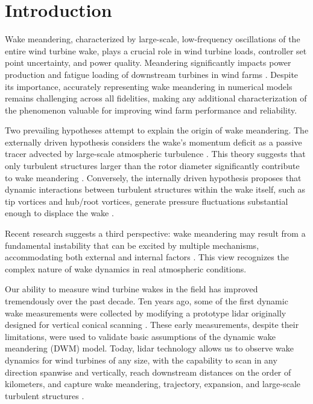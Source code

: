 \documentclass[%
 aip,
 amsmath,
 amssymb,
preprint,%
]{revtex4-2}
\begin{document}
\maketitle

\section{Introduction}
Wake meandering, characterized by large-scale, low-frequency oscillations of the entire wind turbine wake, plays a crucial role in wind turbine loads, controller set point uncertainty, and power quality. 
Meandering significantly impacts power production and fatigue loading of downstream turbines in wind farms \cite{larsen2008wake, brugger2020lidar, wiseWakeMeanderingEffects2020a}. 
Despite its importance, accurately representing wake meandering in numerical models remains challenging across all fidelities, making any additional characterization of the phenomenon valuable for improving wind farm performance and reliability.

Two prevailing hypotheses attempt to explain the origin of wake meandering. 
The externally driven hypothesis considers the wake's momentum deficit as a passive tracer advected by large-scale atmospheric turbulence \cite{larsen2008wake}. 
This theory suggests that only turbulent structures larger than the rotor diameter significantly contribute to wake meandering \cite{espana2012wind}. 
Conversely, the internally driven hypothesis proposes that dynamic interactions between turbulent structures within the wake itself, such as tip vortices and hub/root vortices, generate pressure fluctuations substantial enough to displace the wake \cite{medici2008measurements}.

Recent research suggests a third perspective: wake meandering may result from a fundamental instability that can be excited by multiple mechanisms, accommodating both external and internal factors \cite{andersen2013simulation}. 
This view recognizes the complex nature of wake dynamics in real atmospheric conditions.

Our ability to measure wind turbine wakes in the field has improved tremendously over the past decade. 
Ten years ago, some of the first dynamic wake measurements were collected by modifying a prototype lidar originally designed for vertical conical scanning \cite{bingol_light_2010, trujillo_light_2011}. 
These early measurements, despite their limitations, were used to validate basic assumptions of the dynamic wake meandering (DWM) model. 
Today, lidar technology allows us to observe wake dynamics for wind turbines of any size, with the capability to scan in any direction spanwise and vertically, reach downstream distances on the order of kilometers, and capture wake meandering, trajectory, expansion, and large-scale turbulent structures \cite{brugger2020lidar}.
\end{document}
